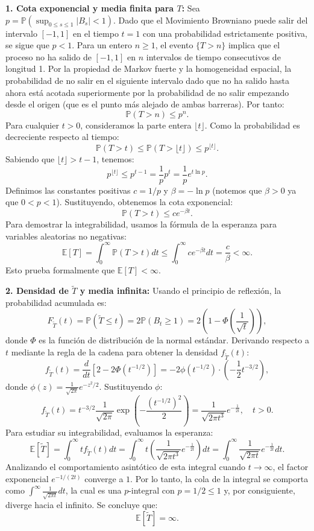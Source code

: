 \documentclass[11pt, letterpaper]{article}
\begin{document}
\begin{solucion}
    \textbf{1. Cota exponencial y media finita para $T$:}
    Sea $p = \mathbb{P}(\sup_{0 \le s \le 1} |B_s| < 1)$. Dado que el Movimiento Browniano puede salir del intervalo $[-1, 1]$ en el tiempo $t=1$ con una probabilidad estrictamente positiva, se sigue que $p < 1$.
    Para un entero $n \ge 1$, el evento $\{T > n\}$ implica que el proceso no ha salido de $[-1, 1]$ en $n$ intervalos de tiempo consecutivos de longitud 1. Por la propiedad de Markov fuerte y la homogeneidad espacial, la probabilidad de no salir en el siguiente intervalo dado que no ha salido hasta ahora está acotada superiormente por la probabilidad de no salir empezando desde el origen (que es el punto más alejado de ambas barreras). Por tanto:
    \[ \mathbb{P}(T > n) \le p^n. \]
    Para cualquier $t > 0$, consideramos la parte entera $\lfloor t \rfloor$. Como la probabilidad es decreciente respecto al tiempo:
    \[ \mathbb{P}(T > t) \le \mathbb{P}(T > \lfloor t \rfloor) \le p^{\lfloor t \rfloor}. \]
    Sabiendo que $\lfloor t \rfloor > t - 1$, tenemos:
    \[ p^{\lfloor t \rfloor} \le p^{t - 1} = \frac{1}{p} p^t = \frac{1}{p} e^{t \ln p}. \]
    Definimos las constantes positivas $c = 1/p$ y $\beta = -\ln p$ (notemos que $\beta > 0$ ya que $0 < p < 1$). Sustituyendo, obtenemos la cota exponencial:
    \[ \mathbb{P}(T > t) \le c e^{-\beta t}. \]
    Para demostrar la integrabilidad, usamos la fórmula de la esperanza para variables aleatorias no negativas:
    \[ \mathbb{E}[T] = \int_0^\infty \mathbb{P}(T > t) dt \le \int_0^\infty c e^{-\beta t} dt = \frac{c}{\beta} < \infty. \]
    Esto prueba formalmente que $\mathbb{E}[T] < \infty$.

    \textbf{2. Densidad de $\tilde{T}$ y media infinita:}
    Usando el principio de reflexión, la probabilidad acumulada es:
    \[ F_{\tilde{T}}(t) = \mathbb{P}(\tilde{T} \le t) = 2\mathbb{P}(B_t \ge 1) = 2 \left( 1 - \Phi\left(\frac{1}{\sqrt{t}}\right) \right), \]
    donde $\Phi$ es la función de distribución de la normal estándar.
    Derivando respecto a $t$ mediante la regla de la cadena para obtener la densidad $f_{\tilde{T}}(t)$:
    \[ f_{\tilde{T}}(t) = \frac{d}{dt} \left[ 2 - 2\Phi(t^{-1/2}) \right] = -2 \phi(t^{-1/2}) \cdot \left( -\frac{1}{2} t^{-3/2} \right), \]
    donde $\phi(z) = \frac{1}{\sqrt{2\pi}} e^{-z^2/2}$. Sustituyendo $\phi$:
    \[ f_{\tilde{T}}(t) = t^{-3/2} \frac{1}{\sqrt{2\pi}} \exp\left(-\frac{(t^{-1/2})^2}{2}\right) = \frac{1}{\sqrt{2\pi t^3}} e^{-\frac{1}{2t}}, \quad t > 0. \]
    Para estudiar su integrabilidad, evaluamos la esperanza:
    \[ \mathbb{E}[\tilde{T}] = \int_0^\infty t f_{\tilde{T}}(t) dt = \int_0^\infty t \left( \frac{1}{\sqrt{2\pi t^3}} e^{-\frac{1}{2t}} \right) dt = \int_0^\infty \frac{1}{\sqrt{2\pi t}} e^{-\frac{1}{2t}} dt. \]
    Analizando el comportamiento asintótico de esta integral cuando $t \to \infty$, el factor exponencial $e^{-1/(2t)}$ converge a $1$. Por lo tanto, la cola de la integral se comporta como $\int^\infty \frac{1}{\sqrt{2\pi t}} dt$, la cual es una $p$-integral con $p = 1/2 \le 1$ y, por consiguiente, diverge hacia el infinito.
    Se concluye que:
    \[ \mathbb{E}[\tilde{T}] = \infty. \]
\end{solucion}
\end{document}
